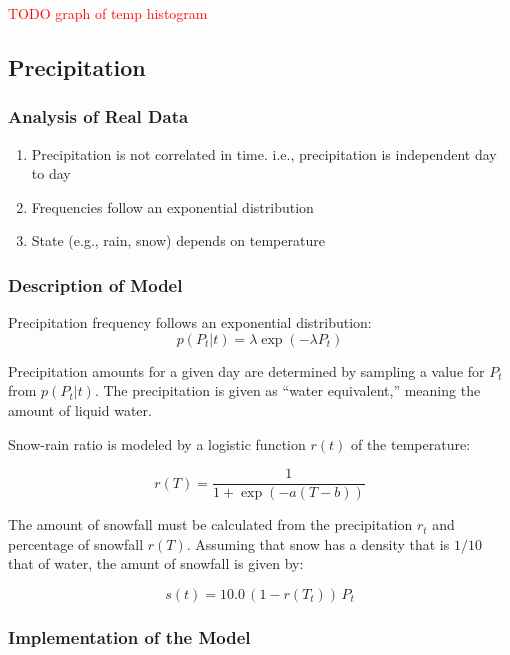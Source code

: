 \documentclass[11pt, letterpaper]{article}
\begin{document}
\textcolor{red}{TODO graph of temp histogram}

\subsection{Precipitation}

\subsubsection{Analysis of Real Data}

\begin{enumerate}
\item Precipitation is not correlated in time.  i.e., precipitation is independent day to day
\item Frequencies follow an exponential distribution
\item State (e.g., rain, snow) depends on temperature
\end{enumerate}

\subsubsection{Description of Model}

Precipitation frequency follows an exponential distribution:
\begin{equation}
p(P_t | t) = \lambda \exp(-\lambda P_t)
\end{equation}

Precipitation amounts for a given day are determined by sampling a value for $P_t$ from $p(P_t | t)$.  The precipitation is given as ``water equivalent,'' meaning the amount of liquid water.

Snow-rain ratio is modeled by a logistic function $r(t)$ of the temperature:

\begin{equation}
r(T) = \frac{1}{1 + \exp(-a (T - b))}
\end{equation}

The amount of snowfall must be calculated from the precipitation $r_t$ and percentage of snowfall $r(T)$.  Assuming that snow has a density that is $1/10$ that of water, the amunt of snowfall is given by:

\begin{equation}
s(t) = 10.0 \, (1 - r(T_t)) \, P_t
\end{equation}

\subsubsection{Implementation of the Model}
\end{document}
